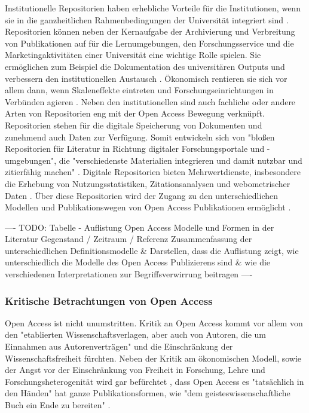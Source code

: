 Institutionelle Repositorien haben erhebliche Vorteile für die Institutionen, wenn sie in die ganzheitlichen Rahmenbedingungen der Universität integriert sind \cite{steele_2006}. Repositorien können neben der Kernaufgabe der Archivierung und Verbreitung von Publikationen auf für die Lernumgebungen, den Forschungsservice und die Marketingaktivitäten einer Universität eine wichtige Rolle spielen. Sie ermöglichen zum Beispiel die Dokumentation des universitären Outputs und verbessern den institutionellen Austausch \cite{steele_2006}. Ökonomisch rentieren sie sich vor allem dann, wenn Skaleneffekte eintreten und Forschungseinrichtungen in Verbünden agieren \cite{blythe_2005value}. Neben den institutionellen sind auch fachliche oder andere Arten von Repositorien eng mit der Open Access Bewegung verknüpft. Repositorien stehen für die digitale Speicherung von Dokumenten und zunehmend auch Daten zur Verfügung. Somit entwickeln sich von "bloßen Repositorien für Literatur in Richtung digitaler Forschungsportale und -umgebungen", die "verschiedenste Materialien integrieren und damit nutzbar und zitierfähig machen" \cite{Schmidt_2009}. Digitale Repositorien bieten Mehrwertdienste, insbesondere die Erhebung von Nutzungsstatistiken, Zitationsanalysen und webometrischer Daten \cite{jahn_2011_personliche} \cite{mayr_2005_webometrie}. Über diese Repositorien wird der Zugang zu den unterschiedlichen Modellen und Publikationswegen von Open Access Publikationen ermöglicht \cite{suber_2015}.

---- TODO: Tabelle - Auflistung Open Access  Modelle und Formen in der Literatur Gegenstand / Zeitraum / Referenz Zusammenfassung der unterschiedlichen Definitionsmodelle & Darstellen, dass die Auflistung zeigt, wie unterschiedlich die Modelle des Open Access Publizierens sind & wie die verschiedenen Interpretationen zur Begriffsverwirrung beitragen ----

\subsubsection{Kritische Betrachtungen von Open Access}

Open Access ist nicht unumstritten. Kritik an Open Access kommt vor allem von den "etablierten Wissenschaftsverlagen, aber auch von Autoren, die um Einnahmen aus Autorenverträgen" \cite{Schirmbacher_oa_2007} und die Einschränkung der Wissenschaftsfreiheit fürchten. Neben der Kritik am ökonomischen Modell, sowie der Angst vor der Einschränkung von Freiheit in Forschung, Lehre und Forschungsheterogenität wird gar befürchtet \cite{Szczesny_2014}, dass Open Access es "tatsächlich in den Händen" hat ganze Publikationsformen, wie "dem geisteswissenschaftliche Buch ein Ende zu bereiten" \cite{Hirschi_2015_buch_oa}.

